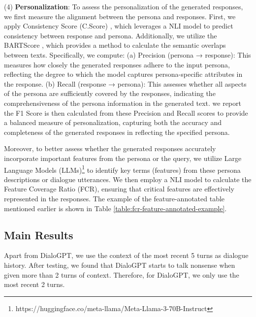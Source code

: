 \documentclass[letterpaper]{article} %
\begin{document}
(4) \textbf{Personalization}: To assess the personalization of the generated responses, we first measure the alignment between the persona and responses. First, we apply Consistency Score (C.Score) \cite{madotto-etal-2019-personalizing}, which leverages a NLI model to predict consistency between response and persona. Additionally, we utilize the BARTScore \cite{yuan-etal-2021-bartscore}, which provides a method to calculate the semantic overlaps between texts. Specifically, we compute: (a) Precision (persona → response): This measures how closely the generated responses adhere to the input persona, reflecting the degree to which the model captures persona-specific attributes in the response. (b) Recall (response → persona): This assesses whether all aspects of the persona are sufficiently covered by the responses, indicating the comprehensiveness of the persona information in the generated text. we report the F1 Score is then calculated from these Precision and Recall scores to provide a balanced measure of personalization, capturing both the accuracy and completeness of the generated responses in reflecting the specified persona.

Moreover, to better assess whether the generated responses accurately incorporate important features from the persona or the query, we utilize Large Language Models (LLMs)\footnote[4]{https://huggingface.co/meta-llama/Meta-Llama-3-70B-Instruct} to identify key terms (features) from these persona descriptions or dialogue utterances. We then employ a NLI model to calculate the Feature Coverage Ratio (FCR), ensuring that critical features are effectively represented in the responses. The example of the feature-annotated table mentioned earlier is shown in Table \ref{table:fcr-feature-annotated-example}.

\subsection{Main Results}

Apart from DialoGPT, we use the context of the most recent 5 turns as dialogue history. After testing, we found that DialoGPT starts to talk nonsense when given more than 2 turns of context. Therefore, for DialoGPT, we only use the most recent 2 turns.
\end{document}
